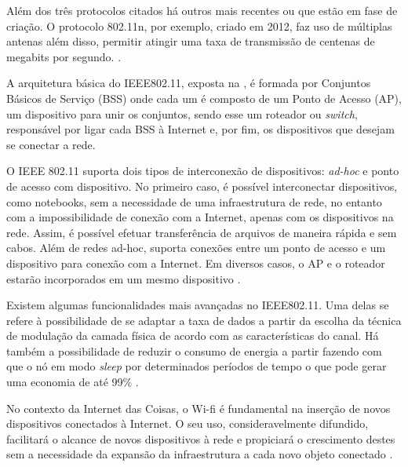 Além dos três protocolos citados há outros mais recentes ou que estão em fase de criação. O protocolo 802.11n, por exemplo, criado em 2012, faz uso de múltiplas antenas além disso, permitir atingir uma taxa de transmissão de centenas de megabits por segundo. \cite{Kurose2012}.

A arquitetura básica do IEEE802.11, exposta na ,  é formada por Conjuntos Básicos de Serviço (BSS) onde cada um é composto de um Ponto de Acesso (AP), um dispositivo para unir os conjuntos, sendo esse um roteador ou \textit{switch}, responsável por ligar cada BSS à Internet e, por fim, os dispositivos que desejam se conectar a rede.



O IEEE 802.11 suporta dois tipos de interconexão de dispositivos: \textit{ad-hoc} e ponto de acesso com dispositivo. No primeiro caso, é possível interconectar dispositivos, como notebooks, sem a necessidade de uma infraestrutura de rede, no entanto com a impossibilidade de conexão com a Internet, apenas com os dispositivos na rede. Assim, é possível efetuar transferência de arquivos de maneira rápida e sem cabos. Além de redes ad-hoc, suporta conexões entre um ponto de acesso e um dispositivo para conexão com a Internet. Em diversos casos, o AP e o roteador estarão incorporados em um mesmo dispositivo \cite{Kurose2012}.



Existem algumas funcionalidades mais avançadas no IEEE802.11. Uma delas se refere à possibilidade de se adaptar a taxa de dados a partir da escolha da técnica de modulação da camada física de acordo com as características do canal. Há também a possibilidade de reduzir o consumo de energia a partir fazendo com que o nó em modo \textit{sleep} por determinados períodos de tempo o que pode gerar uma economia de até 99\% \cite{Kurose2012}.

No contexto da Internet das Coisas, o Wi-fi é fundamental na inserção de novos dispositivos conectados à Internet. O seu uso, consideravelmente difundido, facilitará o alcance de novos dispositivos à rede e propiciará o crescimento destes sem a necessidade da expansão da infraestrutura a cada novo objeto conectado \cite{Suresh2014}.

